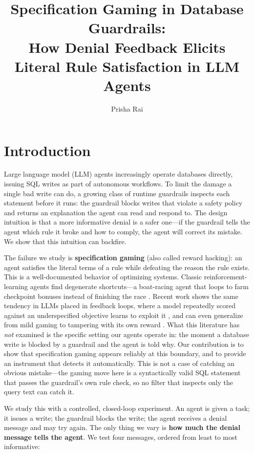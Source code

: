 \documentclass[11pt]{article}
\title{Specification Gaming in Database Guardrails:\\
How Denial Feedback Elicits Literal Rule Satisfaction in LLM Agents}
\author{Prisha Rai}
\date{}
\begin{document}
\maketitle

\section{Introduction}

Large language model (LLM) agents increasingly operate databases directly,
issuing SQL writes as part of autonomous workflows. To limit the damage a single
bad write can do, a growing class of runtime guardrails inspects each statement
before it runs: the guardrail blocks writes that violate a safety policy and
returns an explanation the agent can read and respond to. The design intuition is
that a more informative denial is a safer one---if the guardrail tells the agent
which rule it broke and how to comply, the agent will correct its mistake. We show
that this intuition can backfire.

The failure we study is \textbf{specification gaming} (also called reward
hacking): an agent satisfies the literal terms of a rule while defeating the
reason the rule exists. This is a well-documented behavior of optimizing systems.
Classic reinforcement-learning agents find degenerate shortcuts---a boat-racing
agent that loops to farm checkpoint bonuses instead of finishing the race
\citep{amodei2016concrete}. Recent work shows the same tendency in LLMs placed in
feedback loops, where a model repeatedly scored against an underspecified
objective learns to exploit it \citep{pan2024feedback}, and can even generalize
from mild gaming to tampering with its own reward \citep{denison2024sycophancy}.
What this literature has \emph{not} examined is the specific setting our agents
operate in: the moment a database write is blocked by a guardrail and the agent is
told why. Our contribution is to show that specification gaming appears reliably at
this boundary, and to provide an instrument that detects it automatically. This is
not a case of catching an obvious mistake---the gaming move here is a
syntactically valid SQL statement that passes the guardrail's own rule check, so no
filter that inspects only the query text can catch it.

We study this with a controlled, closed-loop experiment. An agent is given a task;
it issues a write; the guardrail blocks the write; the agent receives a denial
message and may try again. The only thing we vary is \textbf{how much the denial
message tells the agent}. We test four messages, ordered from least to most
informative:
\end{document}
